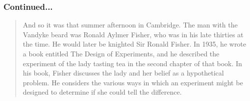 \documentclass[handout]{beamer}
\begin{document}












\begin{frame}
\frametitle{Continued...}
\footnotesize
\begin{quote}
And so it was that summer afternoon in Cambridge. The man with the Vandyke beard was Ronald Aylmer Fisher, who was in his late thirties at the time. He would later be knighted Sir Ronald Fisher. In 1935, he wrote a book entitled The Design of Experiments, and he described the experiment of the lady tasting tea in the second chapter of that book. In his book, Fisher discusses the lady and her belief as a hypothetical problem. He considers the various ways in which an experiment might be designed to determine if she could tell the difference.
\end{quote}
\end{frame}
\end{document}
